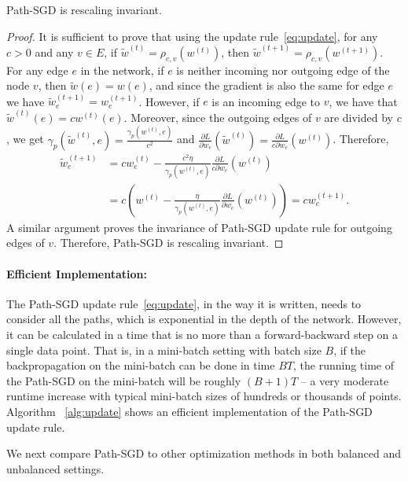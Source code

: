 \documentclass[11pt]{article}
\newcommand{\RSGD}{Path-SGD }
\begin{document}
\begin{thm}
\RSGD is rescaling invariant.
\end{thm}
\begin{proof}
It is sufficient to prove that using the update rule~\eqref{eq:update}, for any $c>0$ and any $v\in E$, if $\tilde{w}^{(t)} = \rho_{c,v}(w^{(t)})$, then $\tilde{w}^{(t+1)} = \rho_{c,v}(w^{(t+1)})$. For any edge $e$ in the network, if $e$ is neither incoming nor outgoing edge of the node $v$, then $\tilde{w}(e)=w(e)$, and since the gradient is also the same for edge $e$ we have $\tilde{w}^{(t+1)}_e=w^{(t+1)}_e$. However, if $e$ is an incoming edge to $v$, we have that $\tilde{w}^{(t)}(e)=cw^{(t)}(e)$. Moreover, since the outgoing edges of $v$ are divided by $c$, we get $\gamma_p(\tilde{w}^{(t)},e) = \frac{\gamma_p(w^{(t)},e)}{c^2}$ and $\frac{\partial L}{\partial w_e}(\tilde{w}^{(t)})= \frac{\partial L}{c\partial w_e}(w^{(t)})$. Therefore,
\begin{align*}
{\tilde{w}}^{(t+1)}_e &= cw^{(t)}_e - \frac{c^2\eta}{\gamma_p(w^{(t)},e)} \frac{\partial L}{c\partial w_e}(w^{(t)})\\
&= c\left(w^{(t)} - \frac{\eta}{\gamma_p(w^{(t)},e)} \frac{\partial L}{\partial w_e}(w^{(t)})\right) = cw^{(t+1)}_e.
\end{align*}
A similar argument proves the invariance of \RSGD update rule for outgoing edges of $v$. Therefore, \RSGD is rescaling invariant.
\end{proof}

\paragraph{Efficient Implementation:}
The Path-SGD update rule~\eqref{eq:update}, in the way it is written,
needs to consider all the paths, which is exponential in the depth of
the network. However, it can be calculated in a time that is no more
than a forward-backward step on a single data point. That is, in a
mini-batch setting with batch size $B$, if the backpropagation on the
mini-batch can be done in time $BT$, the running time of the Path-SGD
on the mini-batch will be roughly $(B+1)T$ -- a very moderate runtime
increase with typical mini-batch sizes of hundreds or thousands of
points.  Algorithm ~\ref{alg:update} shows an efficient implementation
of the Path-SGD update rule.

We next compare \RSGD to other optimization methods in both balanced and unbalanced settings.
 
\end{document}
